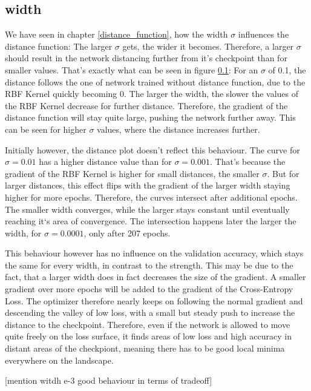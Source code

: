 \subsection{width}
We have seen in chapter \ref{distance_function}, how the width $\sigma$
influences the distance function: The larger $\sigma$ gets, the wider it
becomes. Therefore, a larger $\sigma$ should result in the network distancing
further from it's checkpoint than for smaller values. That's exactly what can be
seen in figure \ref{}: For an $\sigma$ of 0.1, the distance follows the one of
network trained without distance function, due to the RBF Kernel quickly
becoming 0. The larger the width, the slower the values of the RBF Kernel
decrease for further distance. Therefore, the gradient of the distance function
will stay quite large, pushing the network further away. This can be seen for
higher $\sigma$ values, where the distance increases further.


Initially however, the distance plot doesn't reflect this behaviour. The curve
for $\sigma = 0.01$ has a higher distance value than for $\sigma = 0.001$.
That's because the gradient of the RBF Kernel is higher for small distances, the
smaller $\sigma$. But for larger distances, this effect flips with the gradient
of the larger width staying higher for more epochs. Therefore, the curves
intersect after additional epochs. The smaller width converges, while the larger
stays constant until eventually reaching it`s area of convergence. The
intersection happens later the larger the width, for $\sigma = 0.0001$, only
after 207 epochs.

This behaviour however has no influence on the validation accuracy, which stays
the same for every width, in contrast to the strength. This may be due to the
fact, that a larger width does in fact decreases the size of the gradient. A
smaller gradient over more epochs will be added to the gradient of the
Cross-Entropy Loss. The optimizer therefore nearly keeps on following the normal
gradient and descending the valley of low loss, with a small but steady push to
increase the distance to the checkpoint. Therefore, even if the network is
allowed to move quite freely on the loss surface, it finds areas of low loss and
high accuracy in distant areas of the checkpiont, meaning there has to be good
local minima everywhere on the landscape.

[mention witdh e-3 good behaviour in terms of tradeoff]

